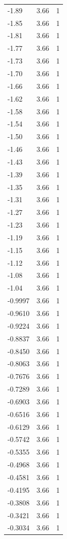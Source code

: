 \begin{longtable}{lrr}
  -1.89 & 3.66 & 1 \\
  -1.85 & 3.66 & 1 \\
  -1.81 & 3.66 & 1 \\
  -1.77 & 3.66 & 1 \\
  -1.73 & 3.66 & 1 \\
  -1.70 & 3.66 & 1 \\
  -1.66 & 3.66 & 1 \\
  -1.62 & 3.66 & 1 \\
  -1.58 & 3.66 & 1 \\
  -1.54 & 3.66 & 1 \\
  -1.50 & 3.66 & 1 \\
  -1.46 & 3.66 & 1 \\
  -1.43 & 3.66 & 1 \\
  -1.39 & 3.66 & 1 \\
  -1.35 & 3.66 & 1 \\
  -1.31 & 3.66 & 1 \\
  -1.27 & 3.66 & 1 \\
  -1.23 & 3.66 & 1 \\
  -1.19 & 3.66 & 1 \\
  -1.15 & 3.66 & 1 \\
  -1.12 & 3.66 & 1 \\
  -1.08 & 3.66 & 1 \\
  -1.04 & 3.66 & 1 \\
  -0.9997 & 3.66 & 1 \\
  -0.9610 & 3.66 & 1 \\
  -0.9224 & 3.66 & 1 \\
  -0.8837 & 3.66 & 1 \\
  -0.8450 & 3.66 & 1 \\
  -0.8063 & 3.66 & 1 \\
  -0.7676 & 3.66 & 1 \\
  -0.7289 & 3.66 & 1 \\
  -0.6903 & 3.66 & 1 \\
  -0.6516 & 3.66 & 1 \\
  -0.6129 & 3.66 & 1 \\
  -0.5742 & 3.66 & 1 \\
  -0.5355 & 3.66 & 1 \\
  -0.4968 & 3.66 & 1 \\
  -0.4581 & 3.66 & 1 \\
  -0.4195 & 3.66 & 1 \\
  -0.3808 & 3.66 & 1 \\
  -0.3421 & 3.66 & 1 \\
  -0.3034 & 3.66 & 1 \\

\end{longtable}
